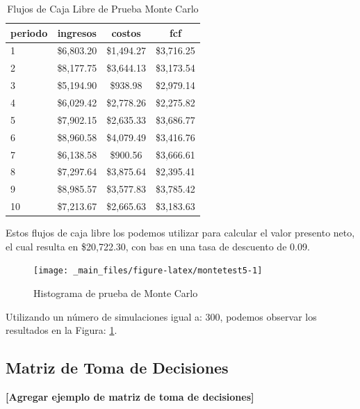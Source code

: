 \documentclass[
]{book}
\begin{document}
\begin{table}

\caption{\label{tab:tabMonteTest4}Flujos de Caja Libre de Prueba Monte Carlo}
\centering
\begin{tabular}[t]{l|c|c|c}
\hline
periodo & ingresos & costos & fcf\\
\hline
1 & \$6,803.20 & \$1,494.27 & \$3,716.25\\
\hline
2 & \$8,177.75 & \$3,644.13 & \$3,173.54\\
\hline
3 & \$5,194.90 & \$938.98 & \$2,979.14\\
\hline
4 & \$6,029.42 & \$2,778.26 & \$2,275.82\\
\hline
5 & \$7,902.15 & \$2,635.33 & \$3,686.77\\
\hline
6 & \$8,960.58 & \$4,079.49 & \$3,416.76\\
\hline
7 & \$6,138.58 & \$900.56 & \$3,666.61\\
\hline
8 & \$7,297.64 & \$3,875.64 & \$2,395.41\\
\hline
9 & \$8,985.57 & \$3,577.83 & \$3,785.42\\
\hline
10 & \$7,213.67 & \$2,665.63 & \$3,183.63\\
\hline
\end{tabular}
\end{table}

Estos flujos de caja libre los podemos utilizar para calcular el valor
presento neto, el cual resulta en \$20,722.30, con bas en una tasa de descuento de
0.09.

\begin{figure}

{\centering \texttt{[image: \_main\_files/figure-latex/montetest5-1]} 

}

\caption{Histograma de prueba de Monte Carlo}\label{fig:montetest5}
\end{figure}

Utilizando un número de
simulaciones igual a: 300, podemos observar los resultados en la Figura:
\ref{fig:montetest5}.

\newpage

\hypertarget{matriz-de-toma-de-decisiones-1}{%
\subsection{Matriz de Toma de Decisiones}\label{matriz-de-toma-de-decisiones-1}}

\textbf{{[}Agregar ejemplo de matriz de toma de decisiones{]}}
\end{document}
